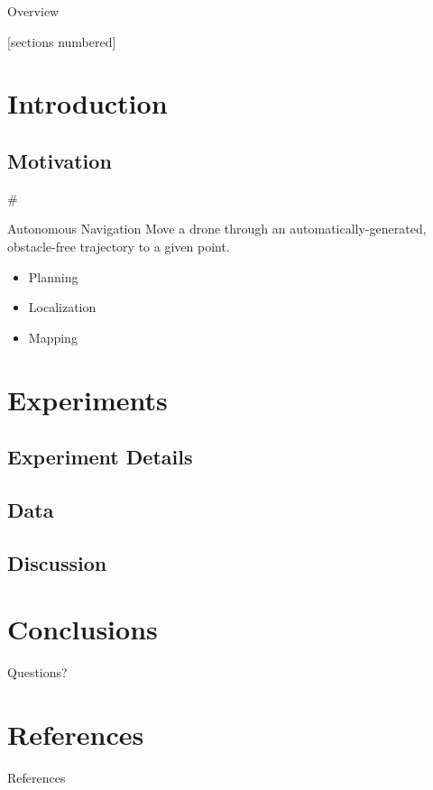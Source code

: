 \documentclass[]{beamer}
\title{}
\author{Guillermo Echegoyen Blanco \\ Universidad de Educaci\'on a Distancia}
\date{\the\year}
\def\mAlertSpace{\vspace{0.5em}}
\newcommand{\mSlideTitle}{{{\color{gray}\secname}} \# \subsecname}
\begin{document}
\maketitle

\begin{frame}{Overview}
  \begin{multicols}{2}
    [sections numbered]
    \tableofcontents[hideallsubsections]
  \end{multicols}
\end{frame}

\section{Introduction}
\subsection{Motivation}
\begin{frame}{\mSlideTitle}
  \begin{alertblock}{Autonomous Navigation}
    \mAlertSpace%
    Move a drone through an automatically-generated, obstacle-free trajectory to a given point.
    \begin{itemize}
      \item Planning
      \item Localization
      \item Mapping
    \end{itemize}
  \end{alertblock}
\end{frame}

\section{Experiments}
\subsection{Experiment Details}
\subsection{Data}
\subsection{Discussion}

\section{Conclusions}

\begin{frame}[standout]
  Questions?
\end{frame}

\section{References}
\begin{frame}[allowframebreaks]{References}
  \printbibliography%
\end{frame}
\end{document}
